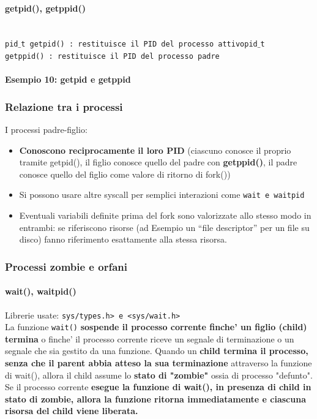 \paragraph{getpid(), getppid()}\hfill \break\\
\texttt{pid$\_$t getpid() : restituisce il PID del processo attivopid$\_$t}\\ 
\texttt{getppid() : restituisce il PID del processo padre}

\paragraph{Esempio 10: getpid e getppid}\hfill \break


\subsubsection{Relazione tra i processi}
I processi padre-figlio:
\begin{itemize}
    \item \textbf{Conoscono reciprocamente il loro PID} (ciascuno conosce il proprio tramite getpid(), il figlio conosce quello del padre con \textbf{getppid()}, il padre conosce quello del figlio come valore di ritorno di fork())
    \item Si possono usare altre syscall per semplici interazioni come \texttt{wait e waitpid }
    \item Eventuali variabili definite prima del fork sono valorizzate allo stesso modo in entrambi: se riferiscono risorse (ad Esempio un “file descriptor” per un file su disco) fanno riferimento esattamente alla stessa risorsa.
\end{itemize} 

\subsubsection{Processi zombie e orfani}
\paragraph{wait(), waitpid()}
Librerie usate: \texttt{sys/types.h> e <sys/wait.h>}\\

La funzione \texttt{wait()} \textbf{sospende il processo corrente finche' un figlio (child) termina} o finche' il processo corrente riceve un segnale di terminazione o un segnale che sia gestito da una funzione.
Quando un \textbf{child termina il processo, senza che il parent abbia atteso la sua terminazione} attraverso la funzione di wait(), allora il child assume lo \textbf{stato di "zombie" } ossia di processo "defunto".
Se il processo corrente \textbf{esegue la funzione di wait(), in presenza di child in stato di zombie, allora la funzione ritorna immediatamente e ciascuna risorsa del child viene liberata.}

